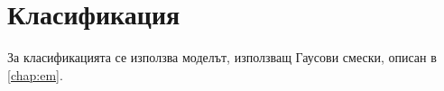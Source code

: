 \documentclass[main.tex]{subfiles}
\begin{document}
\section{Класификация}
За класификацията се използва моделът, използващ Гаусови смески, описан в \autoref{chap:em}.
\end{document}
